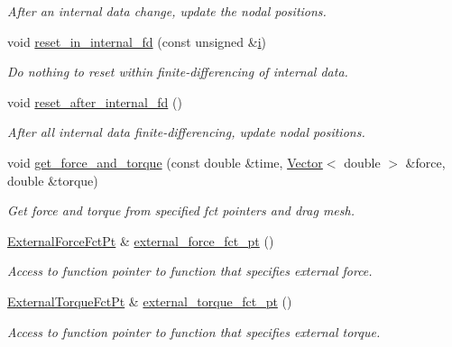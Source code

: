 \begin{DoxyCompactItemize}
\begin{DoxyCompactList}\small\item\em After an internal data change, update the nodal positions. \end{DoxyCompactList}\item 
void \hyperlink{classoomph_1_1ImmersedRigidBodyElement_a6e1d1fa9a6808691d6c067d45d108d2e}{reset\+\_\+in\+\_\+internal\+\_\+fd} (const unsigned \&\hyperlink{cfortran_8h_adb50e893b86b3e55e751a42eab3cba82}{i})
\begin{DoxyCompactList}\small\item\em Do nothing to reset within finite-\/differencing of internal data. \end{DoxyCompactList}\item 
void \hyperlink{classoomph_1_1ImmersedRigidBodyElement_a3fe2dc3e3adbe330de3c7a7a216f49b8}{reset\+\_\+after\+\_\+internal\+\_\+fd} ()
\begin{DoxyCompactList}\small\item\em After all internal data finite-\/differencing, update nodal positions. \end{DoxyCompactList}\item 
void \hyperlink{classoomph_1_1ImmersedRigidBodyElement_ae901e5528aad0dbc2eb7cb43849ae606}{get\+\_\+force\+\_\+and\+\_\+torque} (const double \&time, \hyperlink{classoomph_1_1Vector}{Vector}$<$ double $>$ \&force, double \&torque)
\begin{DoxyCompactList}\small\item\em Get force and torque from specified fct pointers and drag mesh. \end{DoxyCompactList}\item 
\hyperlink{classoomph_1_1ImmersedRigidBodyElement_a7a43bfd54213becfb135b594720b0539}{External\+Force\+Fct\+Pt} \& \hyperlink{classoomph_1_1ImmersedRigidBodyElement_abe0594b64f31848ebb05866fe0cde688}{external\+\_\+force\+\_\+fct\+\_\+pt} ()
\begin{DoxyCompactList}\small\item\em Access to function pointer to function that specifies external force. \end{DoxyCompactList}\item 
\hyperlink{classoomph_1_1ImmersedRigidBodyElement_a455638a1d0e9547290d835513d00c40e}{External\+Torque\+Fct\+Pt} \& \hyperlink{classoomph_1_1ImmersedRigidBodyElement_a06c876a8a96c2d4e168aa6cdc48b1f15}{external\+\_\+torque\+\_\+fct\+\_\+pt} ()
\begin{DoxyCompactList}\small\item\em Access to function pointer to function that specifies external torque. \end{DoxyCompactList}\item 

\end{DoxyCompactItemize}

